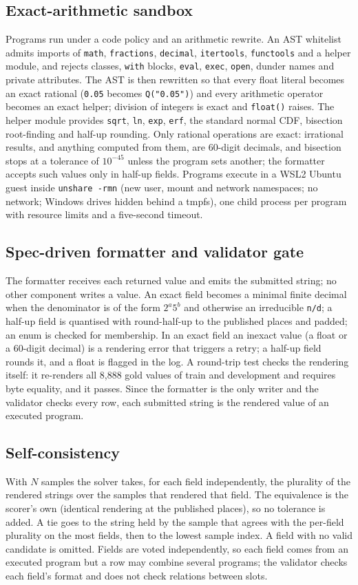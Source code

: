\documentclass[conference]{IEEEtran}
\newcommand{\id}[1]{\texttt{#1}}
\begin{document}
\subsection{Exact-arithmetic sandbox}\label{sec:sandbox}
Programs run under a code policy and an arithmetic rewrite. An AST whitelist admits imports of \id{math}, \id{fractions}, \id{decimal}, \id{itertools}, \id{functools} and a helper module, and rejects classes, \id{with} blocks, \id{eval}, \id{exec}, \id{open}, dunder names and private attributes. The AST is then rewritten so that every float literal becomes an exact rational (\id{0.05} becomes \id{Q("0.05")}) and every arithmetic operator becomes an exact helper; division of integers is exact and \id{float()} raises. The helper module provides \id{sqrt}, \id{ln}, \id{exp}, \id{erf}, the standard normal CDF, bisection root-finding and half-up rounding. Only rational operations are exact: irrational results, and anything computed from them, are 60-digit decimals, and bisection stops at a tolerance of $10^{-45}$ unless the program sets another; the formatter accepts such values only in half-up fields. Programs execute in a WSL2 Ubuntu guest inside \id{unshare -rmn} (new user, mount and network namespaces; no network; Windows drives hidden behind a tmpfs), one child process per program with resource limits and a five-second timeout.

\subsection{Spec-driven formatter and validator gate}
The formatter receives each returned value and emits the submitted string; no other component writes a value. An exact field becomes a minimal finite decimal when the denominator is of the form $2^a5^b$ and otherwise an irreducible \id{n/d}; a half-up field is quantised with round-half-up to the published places and padded; an enum is checked for membership. In an exact field an inexact value (a float or a 60-digit decimal) is a rendering error that triggers a retry; a half-up field rounds it, and a float is flagged in the log. A round-trip test checks the rendering itself: it re-renders all 8,888 gold values of train and development and requires byte equality, and it passes. Since the formatter is the only writer and the validator checks every row, each submitted string is the rendered value of an executed program.

\subsection{Self-consistency}\label{sec:voting}
With $N$ samples the solver takes, for each field independently, the plurality of the rendered strings over the samples that rendered that field. The equivalence is the scorer's own (identical rendering at the published places), so no tolerance is added. A tie goes to the string held by the sample that agrees with the per-field plurality on the most fields, then to the lowest sample index. A field with no valid candidate is omitted. Fields are voted independently, so each field comes from an executed program but a row may combine several programs; the validator checks each field's format and does not check relations between slots.
\end{document}
